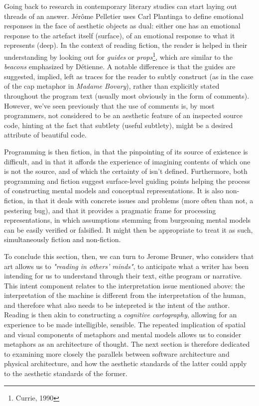 \documentclass{article}
\begin{document}
Going back to research in contemporary literary studies can start laying out threads of an answer. Jérôme Pelletier uses Carl Plantinga to define emotional responses in the face of aesthetic objects as dual: either one has an emotional response to the artefact itself (surface), of an emotional response to what it represents (deep). In the context of reading fiction, the reader is helped in their understanding by looking out for \emph{guides} or \emph{props}\footnote{Currie, 1990}, which are similar to the \emph{beacons} emphasized by Détienne. A notable difference is that the guides are suggested, implied, left as traces for the reader to subtly construct (as in the case of the cap metaphor in \emph{Madame Bovary}), rather than explicitly stated throughout the program text (usually most obviously in the form of comments). However, we've seen previously that the use of comments is, by most programmers, not considered to be an aesthetic feature of an inspected source code, hinting at the fact that subtlety (useful subtlety), might be a desired attribute of beautiful code.

Programming is then fiction, in that the pinpointing of its source of existence is difficult, and in that it affords the experience of imagining contents of which one is not the source, and of which the certainty of isn't defined. Furthermore, both programming and fiction suggest surface-level guiding points helping the process of constructing mental models and conceptual representations. It is also non-fiction, in that it deals with concrete issues and problems (more often than not, a pestering bug), and that it provides a pragmatic frame for processing representations, in which assumptions stemming from burgeoning mental models can be easily verified or falsified. It might then be appropriate to treat it as such, simultaneously fiction and non-fiction.

To conclude this section, then, we can turn to Jerome Bruner, who considers that art allows us to \emph{"reading in others' minds"}, to anticipate what a writer has been intending for us to understand through their text, eithe program or narrative. This intent component relates to the interpretation issue mentioned above: the interpretation of the machine is different from the interpretation of the human, and therefore what also needs to be intepreted is the intent of the author. Reading is then akin to constructing a \emph{cognitive cartography}, allowing for an experience to be made intelligible, sensible. The repeated implication of spatial and visual components of metaphors and mental models allows us to consider metaphors as an architecture of thought\cite{forsythe_cathedrals_1986}. The next section is therefore dedicated to examining more closely the parallels between software architecture and physical architecture, and how the aesthetic standards of the latter could apply to the aesthetic standards of the former.
\end{document}

